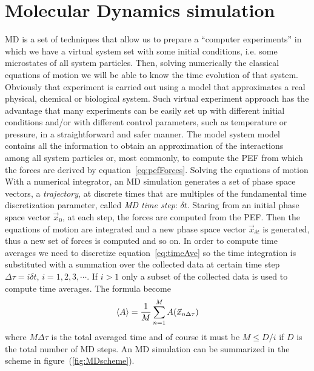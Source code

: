 \section{Molecular Dynamics simulation}
\acf{MD} is a set of techniques that allow us to prepare a ``computer experiments'' in which we have a virtual system set with some initial conditions, i.e. some microstates of all system particles. Then, solving numerically the classical equations of motion we will be able to know the time evolution of that system. Obviously that experiment is carried out using a model that approximates a real physical, chemical or biological system. Such virtual experiment approach has the advantage that many experiments can be easily set up with different initial conditions and/or with different control parameters, such as temperature or pressure, in a straightforward and safer manner.
The model system model contains all the information to obtain an approximation of the interactions among all system particles or, most commonly, to compute the \ac{PEF} from which the forces are derived by equation~\eqref{eq:pefForces}. Solving the equations of motion With a numerical integrator, an \ac{MD} simulation generates a set of phase space vectors, a \textit{trajectory}, at discrete times that are multiples of the fundamental time discretization parameter, called \textit{MD time step}: $\delta t$. Staring from an initial phase space vector $\vec x_0$, at each step, the forces are computed from the \ac{PEF}. Then the equations of motion are
integrated and a new phase space vector $\vec x_{\delta t}$ is generated, thus a new set of forces is computed and so on. In order to compute time averages we need to discretize equation~\eqref{eq:timeAve} so the time integration is substituted with a summation over the collected data at certain time step $\Delta \tau = i \delta t$, $i=1,2,3,\cdots$. If $i > 1$ only a subset of the collected data is used to compute time averages. The formula become
\begin{equation}
	\left \langle A \right \rangle = \frac{1}{M}\sum_{n=1}^M A(\vec x_{n\Delta \tau})
	\label{eq:MDTimeAve}
\end{equation}
where $M\Delta \tau$ is the total averaged time and of course it must be $M \le D/i$ if $D$ is the total number of \ac{MD} steps. An \ac{MD} simulation can be summarized in the scheme in figure~(\ref{fig:MDscheme}).
